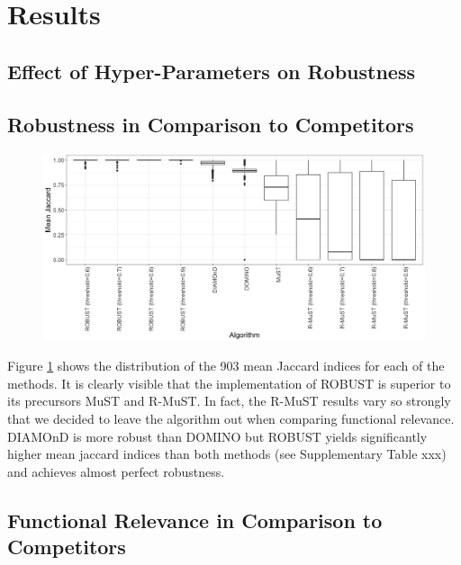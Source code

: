 \documentclass{bioinfo}
\begin{document}
\section{Results}

\subsection{Effect of Hyper-Parameters on Robustness}

\subsection{Robustness in Comparison to Competitors}

\begin{figure}[htb]
\centering
\includegraphics[width=0.95\linewidth]{img/robustness_results_ge05.png}
\caption[]{}
\label{robustness_subset}
\end{figure}

Figure \ref{robustness_subset} shows the distribution of the 903 mean Jaccard indices for each of the methods. It is clearly visible that the implementation of ROBUST is superior to its precursors MuST and R-MuST. In fact, the R-MuST results vary so strongly that we decided to leave the algorithm out when comparing functional relevance. DIAMOnD is more robust than DOMINO but ROBUST yields significantly higher mean jaccard indices than both methods (see Supplementary Table xxx) and achieves almost perfect robustness. 

\subsection{Functional Relevance in Comparison to Competitors}
\end{document}
